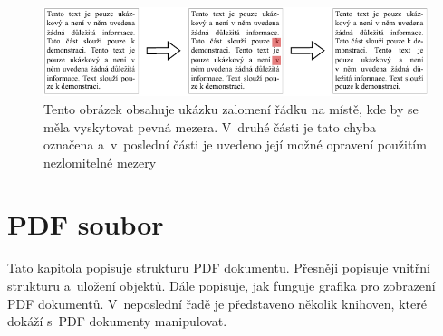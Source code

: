 \begin{figure}[H]
    \centering
    \includegraphics[width=\linewidth]{obrazky-figures/hard_space_example.pdf}
    \caption{
        Tento obrázek obsahuje ukázku zalomení řádku na místě, kde by se měla
        vyskytovat pevná mezera. V~druhé části je tato chyba označena a~v~poslední
        části je uvedeno její možné opravení použitím nezlomitelné mezery
    }
    \label{pic_hard_space}
\end{figure}








\chapter{PDF soubor} \label{PDF_file}
Tato kapitola popisuje strukturu PDF dokumentu. Přesněji popisuje vnitřní
strukturu a~uložení objektů. Dále popisuje, jak funguje grafika pro zobrazení
PDF dokumentů. V~neposlední řadě je představeno několik knihoven, které
dokáží s~PDF dokumenty manipulovat.



